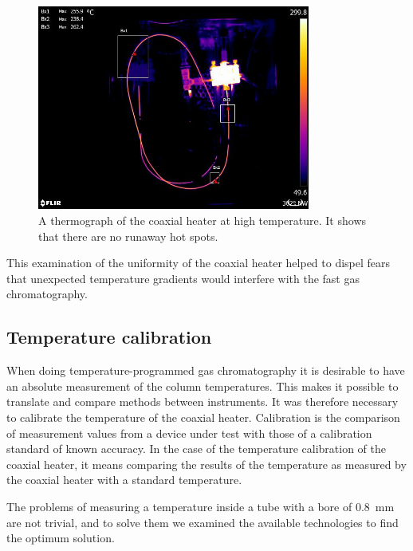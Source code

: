 \begin{figure}
	\centering
	\includegraphics[width=0.8\textwidth]{Figures/ThermalImage}
	\decoRule
	
\caption[A thermograph of the coaxial heater at temperature]{A thermograph of
the coaxial heater at high temperature. It shows that there are no runaway hot
spots.}
	
	\label{fig:ThermalImage}
\end{figure}

This examination of the uniformity of the coaxial heater helped to dispel fears
that unexpected temperature gradients would interfere with the fast gas
chromatography. 

\subsection{Temperature calibration}

When doing temperature-programmed gas chromatography it is desirable to have an
absolute measurement of the column temperatures. This makes it possible to
translate and compare methods between instruments. It was therefore necessary to
calibrate the temperature of the coaxial heater. Calibration is the comparison
of measurement values from a device under test with those of a calibration
standard of known accuracy. In the case of the temperature calibration of the
coaxial heater, it means comparing the results of the temperature as measured by
the coaxial heater with a standard temperature.

The problems of measuring a temperature inside a tube with a bore of
\SI{0.8}{\milli\metre} are not trivial, and to solve them we examined the
available technologies to find the optimum solution.

